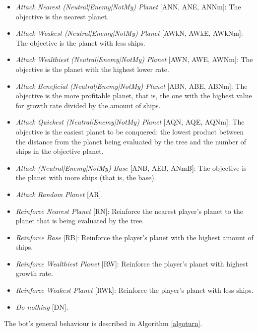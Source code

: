 \documentclass[conference]{IEEEtran}
\begin{document}
\begin{itemize}
\item {\em Attack Nearest (Neutral|Enemy|NotMy) Planet} [ANN, ANE, ANNm]: The objective is the nearest planet.
\item {\em Attack Weakest (Neutral|Enemy|NotMy) Planet} [AWkN, AWkE, AWkNm]: The objective is the planet with less ships.
\item {\em Attack Wealthiest (Neutral|Enemy|NotMy) Planet} [AWN, AWE, AWNm]: The objective is the planet with the highest lower rate.
\item {\em Attack Beneficial (Neutral|Enemy|NotMy) Planet} [ABN, ABE, ABNm]: The objective is the  more profitable planet, that is, the one with the highest value for growth rate divided by the amount of ships.
\item {\em Attack Quickest (Neutral|Enemy|NotMy) Planet} [AQN, AQE, AQNm]: The objective is the easiest planet to be conquered: the lowest product between the distance from the planet being evaluated by the tree and the number of ships in the objective planet.
\item {\em Attack (Neutral|Enemy|NotMy) Base} [ANB, AEB, ANmB]: The objective is the planet with more ships (that is, the base).
\item {\em Attack Random Planet} [AR].
\item {\em Reinforce Nearest Planet} [RN]: Reinforce the nearest player's planet to the planet that is being evaluated by the tree.
\item {\em Reinforce Base} [RB]: Reinforce the player's planet with the highest amount of ships.
\item {\em Reinforce Wealthiest Planet} [RW]: Reinforce the player's planet with highest growth rate.
\item {\em Reinforce Weakest Planet} [RWk]: Reinforce the player's planet with less ships.
\item {\em Do nothing} [DN].

\end{itemize}

The bot's general behaviour is described in Algorithm \ref{algoturn}.
\end{document}
